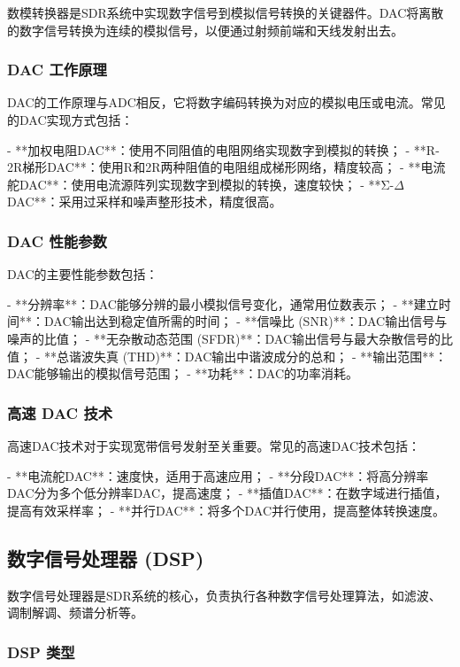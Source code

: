 ﻿\documentclass[UTF8]{ctexbook}
\begin{document}
数模转换器是SDR系统中实现数字信号到模拟信号转换的关键器件。DAC将离散的数字信号转换为连续的模拟信号，以便通过射频前端和天线发射出去。

\subsubsection{DAC 工作原理}

DAC的工作原理与ADC相反，它将数字编码转换为对应的模拟电压或电流。常见的DAC实现方式包括：

- **加权电阻DAC**：使用不同阻值的电阻网络实现数字到模拟的转换；
- **R-2R梯形DAC**：使用R和2R两种阻值的电阻组成梯形网络，精度较高；
- **电流舵DAC**：使用电流源阵列实现数字到模拟的转换，速度较快；
- **Σ-\(\Delta\) DAC**：采用过采样和噪声整形技术，精度很高。

\subsubsection{DAC 性能参数}

DAC的主要性能参数包括：

- **分辨率**：DAC能够分辨的最小模拟信号变化，通常用位数表示；
- **建立时间**：DAC输出达到稳定值所需的时间；
- **信噪比 (SNR)**：DAC输出信号与噪声的比值；
- **无杂散动态范围 (SFDR)**：DAC输出信号与最大杂散信号的比值；
- **总谐波失真 (THD)**：DAC输出中谐波成分的总和；
- **输出范围**：DAC能够输出的模拟信号范围；
- **功耗**：DAC的功率消耗。

\subsubsection{高速 DAC 技术}

高速DAC技术对于实现宽带信号发射至关重要。常见的高速DAC技术包括：

- **电流舵DAC**：速度快，适用于高速应用；
- **分段DAC**：将高分辨率DAC分为多个低分辨率DAC，提高速度；
- **插值DAC**：在数字域进行插值，提高有效采样率；
- **并行DAC**：将多个DAC并行使用，提高整体转换速度。
\subsection{数字信号处理器 (DSP)}

数字信号处理器是SDR系统的核心，负责执行各种数字信号处理算法，如滤波、调制解调、频谱分析等。

\subsubsection{DSP 类型}
\end{document}
